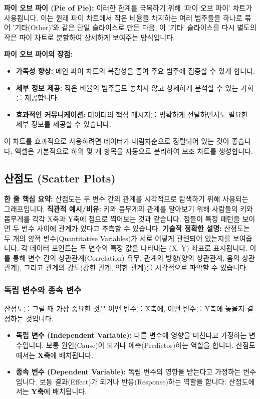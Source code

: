 \documentclass[11pt,a4paper]{article}
\begin{document}
\begin{conceptbox}
\textbf{파이 오브 파이 (Pie of Pie):} 이러한 한계를 극복하기 위해 '파이 오브 파이' 차트가 사용됩니다. 이는 원래 파이 차트에서 작은 비율을 차지하는 여러 범주들을 하나로 묶어 '기타(Other)'와 같은 단일 슬라이스로 만든 다음, 이 '기타' 슬라이스를 다시 별도의 작은 파이 차트로 분할하여 상세하게 보여주는 방식입니다.
\end{conceptbox}

\textbf{파이 오브 파이의 장점:}
\begin{itemize}
    \item \textbf{가독성 향상:} 메인 파이 차트의 복잡성을 줄여 주요 범주에 집중할 수 있게 합니다.
    \item \textbf{세부 정보 제공:} 작은 비율의 범주들도 놓치지 않고 상세하게 분석할 수 있는 기회를 제공합니다.
    \item \textbf{효과적인 커뮤니케이션:} 데이터의 핵심 메시지를 명확하게 전달하면서도 필요한 세부 정보를 제공할 수 있습니다.
\end{itemize}
이 차트를 효과적으로 사용하려면 데이터가 내림차순으로 정렬되어 있는 것이 좋습니다. 엑셀은 기본적으로 하위 몇 개 항목을 자동으로 분리하여 보조 차트를 생성합니다.

\newpage
\subsection{산점도 (Scatter Plots)}

\begin{conceptbox}
\textbf{한 줄 핵심 요약:} 산점도는 두 변수 간의 관계를 시각적으로 탐색하기 위해 사용되는 그래프입니다.
\textbf{직관적 예시/비유:} 키와 몸무게의 관계를 알아보기 위해 사람들의 키와 몸무게를 각각 X축과 Y축에 점으로 찍어보는 것과 같습니다. 점들이 특정 패턴을 보이면 두 변수 사이에 관계가 있다고 추측할 수 있습니다.
\textbf{기술적 정확한 설명:} 산점도는 두 개의 양적 변수(Quantitative Variables)가 서로 어떻게 관련되어 있는지를 보여줍니다. 각 데이터 포인트는 두 변수의 특정 값을 나타내는 (X, Y) 좌표로 표시됩니다. 이를 통해 변수 간의 상관관계(Correlation) 유무, 관계의 방향(양의 상관관계, 음의 상관관계), 그리고 관계의 강도(강한 관계, 약한 관계)를 시각적으로 파악할 수 있습니다.
\end{conceptbox}

\subsubsection{독립 변수와 종속 변수}
산점도를 그릴 때 가장 중요한 것은 어떤 변수를 X축에, 어떤 변수를 Y축에 놓을지 결정하는 것입니다.
\begin{itemize}
    \item \textbf{독립 변수 (Independent Variable):} 다른 변수에 영향을 미친다고 가정하는 변수입니다. 보통 원인(Cause)이 되거나 예측(Predictor)하는 역할을 합니다. 산점도에서는 \textbf{X축}에 배치됩니다.
    \item \textbf{종속 변수 (Dependent Variable):} 독립 변수의 영향을 받는다고 가정하는 변수입니다. 보통 결과(Effect)가 되거나 반응(Response)하는 역할을 합니다. 산점도에서는 \textbf{Y축}에 배치됩니다.
\end{itemize}
\end{document}
